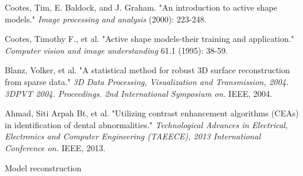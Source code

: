 \documentclass[a4paper]{article}
\begin{document}
 

\begin{thebibliography}{99}

 Cootes, Tim, E. Baldock, and J. Graham. "An introduction to active shape models." \textit{Image processing and analysis} (2000): 223-248.

 Cootes, Timothy F., et al. "Active shape models-their training and application." \textit{Computer vision and image understanding} 61.1 (1995): 38-59.

 Blanz, Volker, et al. "A statistical method for robust 3D surface reconstruction from sparse data." \textit{3D Data Processing, Visualization and Transmission, 2004. 3DPVT 2004. Proceedings. 2nd International Symposium on.} IEEE, 2004.

 Ahmad, Siti Arpah Bt, et al. "Utilizing contrast enhancement algorithms (CEAs) in identification of dental abnormalities." \textit{Technological Advances in Electrical, Electronics and Computer Engineering (TAEECE), 2013 International Conference on.} IEEE, 2013.

Model reconstruction 
% 

\end{thebibliography}
\end{document}
